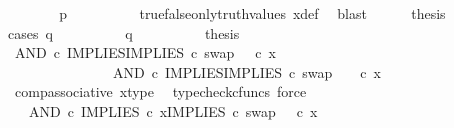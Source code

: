 \begin{isabellebody}
\ \ \ \ \isamarkupfalse%
\ \isamarkupfalse%
\ {\isachardoublequoteopen}p\ {\isacharequal}{\kern0pt}\ {\isasymf}{\isachardoublequoteclose}\isanewline
\ \ \ \ \ \ \isamarkupfalse%
\ true{\isacharunderscore}{\kern0pt}false{\isacharunderscore}{\kern0pt}only{\isacharunderscore}{\kern0pt}truth{\isacharunderscore}{\kern0pt}values\ x{\isacharunderscore}{\kern0pt}def\ \isamarkupfalse%
\ blast\isanewline
\ \ \ \ \isamarkupfalse%
\ {\isacharquery}{\kern0pt}thesis\isanewline
\ \ \ \ \isamarkupfalse%
{\isacharparenleft}{\kern0pt}cases\ {\isachardoublequoteopen}q\ {\isacharequal}{\kern0pt}\ {\isasymt}{\isachardoublequoteclose}{\isacharparenright}{\kern0pt}\isanewline
\ \ \ \ \ \ \isamarkupfalse%
\ {\isachardoublequoteopen}q\ {\isacharequal}{\kern0pt}\ {\isasymt}{\isachardoublequoteclose}\isanewline
\ \ \ \ \ \ \isamarkupfalse%
\ {\isacharquery}{\kern0pt}thesis\isanewline
\ \ \ \ \ \ \isamarkupfalse%
\ {\isacharminus}{\kern0pt}\ \isanewline
\ \ \ \ \ \ \ \ \isamarkupfalse%
\ {\isachardoublequoteopen}{\isacharparenleft}{\kern0pt}AND\ {\isasymcirc}\isactrlsub c\ {\isasymlangle}IMPLIES{\isacharcomma}{\kern0pt}IMPLIES\ {\isasymcirc}\isactrlsub c\ swap\ {\isasymOmega}\ {\isasymOmega}{\isasymrangle}{\isacharparenright}{\kern0pt}\ {\isasymcirc}\isactrlsub c\ x\ {\isacharequal}{\kern0pt}\ \ \ \ \isanewline
\ \ \ \ \ \ \ \ \ \ \ \ \ \ \ AND\ {\isasymcirc}\isactrlsub c\ {\isasymlangle}IMPLIES{\isacharcomma}{\kern0pt}IMPLIES\ {\isasymcirc}\isactrlsub c\ swap\ {\isasymOmega}\ {\isasymOmega}{\isasymrangle}\ \ {\isasymcirc}\isactrlsub c\ x{\isachardoublequoteclose}\isanewline
\ \ \ \ \ \ \ \ \ \ \isamarkupfalse%
\ comp{\isacharunderscore}{\kern0pt}associative{}\ x{\isacharunderscore}{\kern0pt}type\ \isamarkupfalse%
\ {\isacharparenleft}{\kern0pt}typecheck{\isacharunderscore}{\kern0pt}cfuncs{\isacharcomma}{\kern0pt}\ force{\isacharparenright}{\kern0pt}\isanewline
\ \ \ \ \ \ \ \ \isamarkupfalse%
\ \isamarkupfalse%
\ {\isachardoublequoteopen}{\isachardot}{\kern0pt}{\isachardot}{\kern0pt}{\isachardot}{\kern0pt}\ {\isacharequal}{\kern0pt}\ AND\ {\isasymcirc}\isactrlsub c\ {\isasymlangle}IMPLIES\ {\isasymcirc}\isactrlsub c\ x{\isacharcomma}{\kern0pt}IMPLIES\ {\isasymcirc}\isactrlsub c\ swap\ {\isasymOmega}\ {\isasymOmega}\ {\isasymcirc}\isactrlsub c\ x{\isasymrangle}{\isachardoublequoteclose}\isanewline
\ \ \ \ \ \ \ \ \ \ \isamarkupfalse%

\end{isabellebody}
